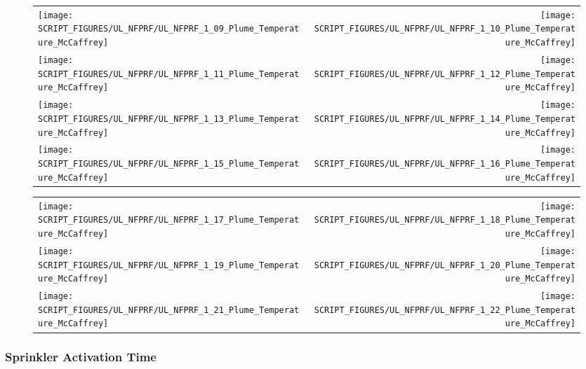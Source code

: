 \begin{figure}[p]
\begin{tabular*}{\textwidth}{l@{\extracolsep{\fill}}r}
\texttt{[image: SCRIPT\_FIGURES/UL\_NFPRF/UL\_NFPRF\_1\_09\_Plume\_Temperature\_McCaffrey]} &
\texttt{[image: SCRIPT\_FIGURES/UL\_NFPRF/UL\_NFPRF\_1\_10\_Plume\_Temperature\_McCaffrey]} \\
\texttt{[image: SCRIPT\_FIGURES/UL\_NFPRF/UL\_NFPRF\_1\_11\_Plume\_Temperature\_McCaffrey]} &
\texttt{[image: SCRIPT\_FIGURES/UL\_NFPRF/UL\_NFPRF\_1\_12\_Plume\_Temperature\_McCaffrey]} \\
\texttt{[image: SCRIPT\_FIGURES/UL\_NFPRF/UL\_NFPRF\_1\_13\_Plume\_Temperature\_McCaffrey]} &
\texttt{[image: SCRIPT\_FIGURES/UL\_NFPRF/UL\_NFPRF\_1\_14\_Plume\_Temperature\_McCaffrey]} \\
\texttt{[image: SCRIPT\_FIGURES/UL\_NFPRF/UL\_NFPRF\_1\_15\_Plume\_Temperature\_McCaffrey]} &
\texttt{[image: SCRIPT\_FIGURES/UL\_NFPRF/UL\_NFPRF\_1\_16\_Plume\_Temperature\_McCaffrey]}
\end{tabular*}
\end{figure}

\begin{figure}[p]
\begin{tabular*}{\textwidth}{l@{\extracolsep{\fill}}r}
\texttt{[image: SCRIPT\_FIGURES/UL\_NFPRF/UL\_NFPRF\_1\_17\_Plume\_Temperature\_McCaffrey]} &
\texttt{[image: SCRIPT\_FIGURES/UL\_NFPRF/UL\_NFPRF\_1\_18\_Plume\_Temperature\_McCaffrey]} \\
\texttt{[image: SCRIPT\_FIGURES/UL\_NFPRF/UL\_NFPRF\_1\_19\_Plume\_Temperature\_McCaffrey]} &
\texttt{[image: SCRIPT\_FIGURES/UL\_NFPRF/UL\_NFPRF\_1\_20\_Plume\_Temperature\_McCaffrey]} \\
\texttt{[image: SCRIPT\_FIGURES/UL\_NFPRF/UL\_NFPRF\_1\_21\_Plume\_Temperature\_McCaffrey]} &
\texttt{[image: SCRIPT\_FIGURES/UL\_NFPRF/UL\_NFPRF\_1\_22\_Plume\_Temperature\_McCaffrey]}
\end{tabular*}
\end{figure}

\clearpage

\subsubsection{Sprinkler Activation Time}

